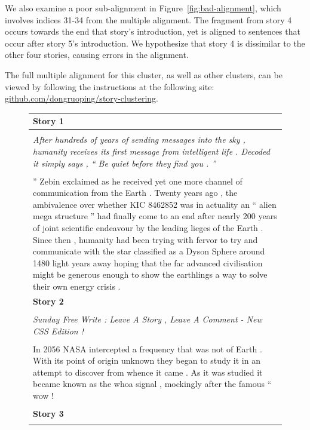\documentclass{article}
\begin{document}
We also examine a poor sub-alignment in Figure~\ref{fig:bad-alignment},
which involves indices 31-34 from the multiple alignment.
The fragment from story 4 occurs towards the end that story's introduction,
yet is aligned to sentences that occur after story 5's introduction.
We hypothesize that story 4 is dissimilar to the other four stories,
causing errors in the alignment.

The full multiple alignment for this cluster, as well as other clusters,
can be viewed by following the instructions at the following site:
\href{https://github.com/dongruoping/story-clustering/}{github.com/dongruoping/story-clustering}.

\begin{figure}[h]
\centering
\small
\begin{tabular}{|p{\textwidth}|}
\hline
\textbf{Story 1}
\\
\hline
\\
\textit{After hundreds of years of sending messages into the sky , humanity receives its first message from intelligent life . Decoded it simply says , `` Be quiet before they find you . ''}
\\
\\
'' Zebin exclaimed as he received yet one more channel of communication from the Earth .
Twenty years ago , the ambivalence over whether KIC 8462852 was in actuality an `` alien mega structure '' had finally come to an end after nearly 200 years of joint scientific endeavour by the leading lieges of the Earth .
Since then , humanity had been trying with fervor to try and communicate with the star classified as a Dyson Sphere around 1480 light years away hoping that the far advanced civilisation might be generous enough to show the earthlings a way to solve their own energy crisis .
\\
\hline
\textbf{Story 2}
\\
\hline
\\
\textit{Sunday Free Write : Leave A Story , Leave A Comment - New CSS Edition !}
\\
\\
In 2056 NASA intercepted a frequency that was not of Earth .
With its point of origin unknown they began to study it in an attempt to discover from whence it came .
As it was studied it became known as the whoa signal , mockingly after the famous `` wow !
\\
\\
\hline
\textbf{Story 3}
\\
\hline
\\

\end{tabular}
\end{figure}
\end{document}
